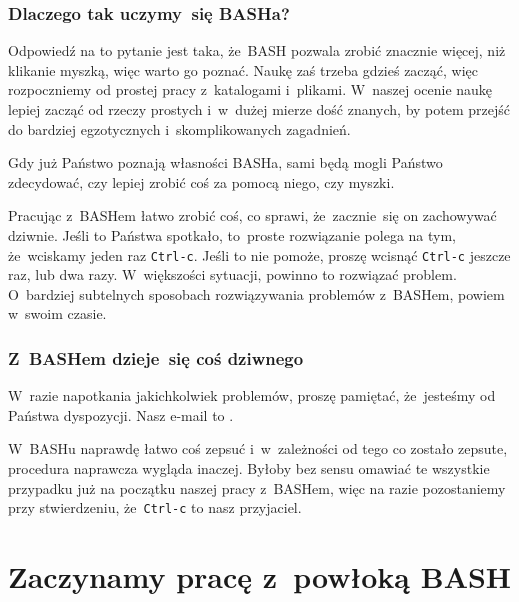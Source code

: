 \documentclass[10pt,t]{beamer}
\begin{document}
\begin{frame}
  \frametitle{Dlaczego tak uczymy~się BASHa?}


  Odpowiedź na to pytanie jest taka, że~BASH pozwala zrobić znacznie więcej,
  niż klikanie myszką, więc warto go poznać. Naukę zaś trzeba gdzieś zacząć,
  więc rozpoczniemy od prostej pracy z~katalogami i~plikami. W~naszej
  ocenie naukę lepiej zacząć od rzeczy prostych i~w~dużej mierze dość
  znanych, by potem przejść do bardziej egzotycznych i~skomplikowanych
  zagadnień.

  Gdy już Państwo poznają własności BASHa, sami będą mogli Państwo
  zdecydować, czy lepiej zrobić coś za pomocą niego, czy myszki.

  Pracując z~BASHem łatwo zrobić coś, co sprawi, że~zacznie~się on
  zachowywać dziwnie. Jeśli to Państwa spotkało, to~proste rozwiązanie
  polega na tym, że~wciskamy jeden raz \texttt{Ctrl-c}. Jeśli to nie
  pomoże, proszę wcisnąć \texttt{Ctrl-c} jeszcze raz, lub dwa razy.
  W~większości sytuacji, powinno to rozwiązać problem. O~bardziej subtelnych
  sposobach rozwiązywania problemów z~BASHem, powiem w~swoim czasie.

\end{frame}





\begin{frame}
  \frametitle{Z~BASHem dzieje~się coś dziwnego}


  W~razie napotkania jakichkolwiek problemów, proszę pamiętać, że~jesteśmy
  od Państwa dyspozycji. Nasz e-mail to \email.

  W~BASHu naprawdę łatwo coś zepsuć i~w~zależności od tego co zostało
  zepsute, procedura naprawcza wygląda inaczej. Byłoby bez sensu omawiać
  te wszystkie przypadku już na początku naszej pracy z~BASHem, więc
  na razie pozostaniemy przy stwierdzeniu, że~\texttt{Ctrl-c} to nasz
  przyjaciel.

\end{frame}










\section{Zaczynamy pracę z~powłoką BASH}
\end{document}

